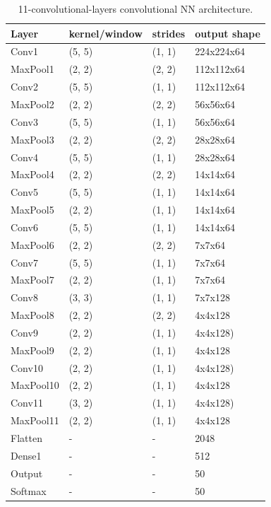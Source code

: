 \documentclass[a4paper]{article}
\begin{document}
\begin{table}[!h]
    \caption{11-convolutional-layers convolutional NN architecture.
    \label{table:layers11}
    }
\begin{center}
    \begin{tabular}{| l | l | l | l |}
    \hline
        Layer & kernel/window& strides & output shape\\
    \hline
        Conv1  & (5, 5)&        (1, 1)&     224x224x64  \\
    \hline
        MaxPool1 & (2, 2)&      (2, 2)&     112x112x64  \\
        Conv2  & (5, 5)&        (1, 1)&     112x112x64  \\
    \hline
        MaxPool2 & (2, 2)&      (2, 2)&     56x56x64    \\
        Conv3  & (5, 5)&        (1, 1)&     56x56x64    \\
    \hline
        MaxPool3 & (2, 2)&      (2, 2)&     28x28x64    \\
        Conv4  & (5, 5)&        (1, 1)&     28x28x64  \\
    \hline
        MaxPool4 & (2, 2)&      (2, 2)&     14x14x64  \\
        Conv5  & (5, 5)&        (1, 1)&     14x14x64  \\ %
    \hline
        MaxPool5 & (2, 2)&      (1, 1)&     14x14x64  \\
        Conv6  & (5, 5)&        (1, 1)&     14x14x64  \\
    \hline
        MaxPool6 & (2, 2)&      (2, 2)&     7x7x64  \\
        Conv7  & (5, 5)&        (1, 1)&     7x7x64  \\  %
    \hline
        MaxPool7 & (2, 2)&      (1, 1)&     7x7x64  \\
        Conv8  & (3, 3)&        (1, 1)&     7x7x128\\
    \hline
        MaxPool8 & (2, 2)&      (2, 2)&     4x4x128  \\
        Conv9  & (2, 2)&        (1, 1)&     4x4x128)\\
    \hline
        MaxPool9 & (2, 2)&      (1, 1)&     4x4x128  \\
        Conv10 & (2, 2)&        (1, 1)&     4x4x128)\\  %
    \hline
        MaxPool10 & (2, 2)&      (1, 1)&     4x4x128  \\
        Conv11 & (3, 2)&        (1, 1)&     4x4x128)\\  %
    \hline
        MaxPool11 & (2, 2)&      (1, 1)&     4x4x128  \\
        Flatten & - & - & 2048 \\
        Dense1 & - & - & 512 \\
    \hline
        Output & - & - & 50 \\
        Softmax & - & - & 50 \\
    \hline
    \end{tabular}
\end{center}
\end{table}
\end{document}
